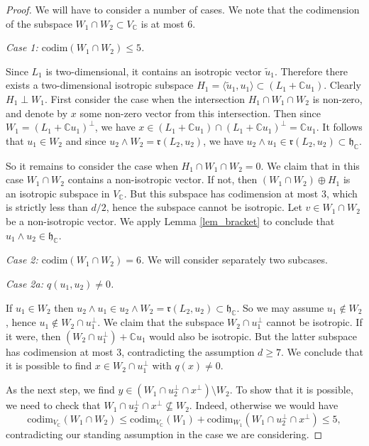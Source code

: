 \documentclass[10pt,a4paper]{amsart}
\newcommand{\bbC}{\mathbb{C}}
\newcommand{\frh}{\mathfrak{h}}
\newcommand{\frr}{\mathfrak{r}}
\renewcommand{\ge}{\geqslant}
\renewcommand{\le}{\leqslant}
\newcommand{\wdg}{\wedge}
\begin{document}
\begin{proof}
We will have to consider a number of cases. We note that the codimension of
the subspace $W_1\cap W_2\subset V_\bbC$ is at most 6.

\medskip
{\it Case 1: $\mathrm{codim}(W_1\cap W_2) \le 5$.}

Since $L_1$ is two-dimensional, it contains an isotropic vector $\tilde{u}_1$.
Therefore there exists a two-dimensional isotropic subspace $H_1 = \langle\tilde{u}_1,u_1\rangle\subset (L_1+\bbC u_1)$.
Clearly $H_1\perp W_1$.
First consider the case when the intersection $H_1\cap W_1\cap W_2$ is non-zero,
and denote by $x$ some non-zero vector from this intersection.
Then since $W_1 = (L_1+ \bbC u_1)^\perp$, we have $x\in (L_1+ \bbC u_1)\cap (L_1+ \bbC u_1)^\perp = \bbC u_1$.
It follows that $u_1\in W_2$ and since $u_2\wdg W_2 = \frr(L_2,u_2)$,
we have $u_2\wdg u_1 \in \frr(L_2,u_2)\subset \frh_\bbC$.

So it remains to consider the case when $H_1\cap W_1\cap W_2 = 0$.
We claim that in this case $W_1\cap W_2$ contains a non-isotropic vector.
If not, then $(W_1\cap W_2)\oplus H_1$ is an isotropic subspace in $V_\bbC$.
But this subspace has codimension at most 3, which is strictly less than $d/2$,
hence the subspace cannot be isotropic. Let $v\in W_1\cap W_2$ be a non-isotropic vector.
We apply Lemma \ref{lem_bracket} to conclude that $u_1\wdg u_2\in \frh_\bbC$.

\medskip
{\it Case 2: $\mathrm{codim}(W_1\cap W_2) = 6$.}
We will consider separately two subcases.

\medskip
{\it Case 2a: $q(u_1, u_2)\neq 0$.}

If $u_1\in W_2$ then $u_2\wdg u_1\in u_2\wdg W_2 = \frr(L_2,u_2)\subset \frh_\bbC$. So we may assume
$u_1\notin W_2$, hence $u_1\notin W_2\cap u_1^\perp$.
We claim that the subspace $W_2\cap u_1^\perp$ cannot be isotropic.
If it were, then $(W_2\cap u_1^\perp)+\bbC u_1$ would also be isotropic.
But the latter subspace has codimension at most 3, contradicting the assumption $d\ge 7$.
We conclude that it is possible to find $x\in W_2\cap u_1^\perp$ with $q(x)\neq 0$.

As the next step, we find $y\in (W_1\cap u_2^\perp \cap x^\perp) \setminus W_2$.
To show that it is possible, we need to check that $W_1\cap u_2^\perp \cap x^\perp\nsubseteq W_2$.
Indeed, otherwise we would have
\begin{displaymath}
\mathrm{codim}_{V_\bbC}(W_1\cap W_2) \le \mathrm{codim}_{V_\bbC}(W_1) + \mathrm{codim}_{W_1}(W_1\cap u_2^\perp \cap x^\perp)\le 5,
\end{displaymath}
contradicting our standing assumption in the case we are considering.


\end{proof}
\end{document}
